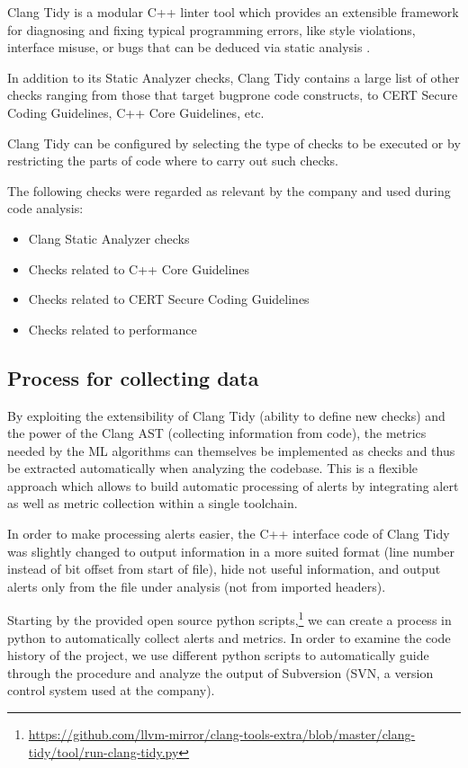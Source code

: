 Clang Tidy is a modular C++ linter tool which provides an extensible framework for diagnosing and fixing typical programming errors, like style violations, interface misuse, or bugs that can be deduced via static analysis \cite{clang_tidy}. 

In addition to its Static Analyzer checks, Clang Tidy contains a large list of other checks ranging from those that target bugprone code constructs, to CERT Secure Coding Guidelines, C++ Core Guidelines, etc.

Clang Tidy can be configured by selecting the type of checks to be executed or by restricting the parts of code where to carry out such checks.

The following checks were regarded as relevant by the company and used during code analysis:
\begin{itemize}
	\item Clang Static Analyzer checks
	\item Checks related to C++ Core Guidelines
	\item Checks related to CERT Secure Coding Guidelines
	\item Checks related to performance
\end{itemize}

\subsection{Process for collecting data \label{data_collection}}

By exploiting the extensibility of Clang Tidy (ability to define new checks) and the power of the Clang AST (collecting information from code), the metrics needed by the ML algorithms can themselves be implemented as checks and thus be extracted automatically when analyzing the codebase. This is a flexible approach which allows to build automatic processing of alerts by integrating alert as well as metric collection within a single toolchain.

In order to make processing alerts easier, the C++ interface code of Clang Tidy was slightly changed to output information in a more suited format (line number instead of bit offset from start of file), hide not useful information, and output alerts only from the file under analysis (not from imported headers).

Starting by the provided open source python scripts,\footnote{\url{https://github.com/llvm-mirror/clang-tools-extra/blob/master/clang-tidy/tool/run-clang-tidy.py}} we can create a process in python to automatically collect alerts and metrics. In order to examine the code history of the project, we use different python scripts to automatically guide through the procedure and analyze the output of Subversion (SVN, a version control system used at the company).

